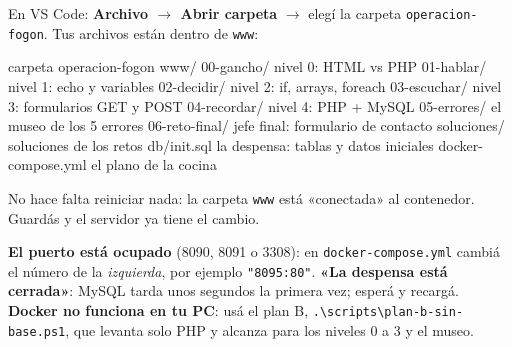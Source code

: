En VS Code: \textbf{Archivo $\rightarrow$ Abrir carpeta} $\rightarrow$ elegí la carpeta \texttt{operacion-fogon}. Tus archivos
están dentro de \texttt{www}:
\begin{terminal}[estructura]{carpeta operacion-fogon}
www/
  00-gancho/       nivel 0: HTML vs PHP
  01-hablar/       nivel 1: echo y variables
  02-decidir/      nivel 2: if, arrays, foreach
  03-escuchar/     nivel 3: formularios GET y POST
  04-recordar/     nivel 4: PHP + MySQL
  05-errores/      el museo de los 5 errores
  06-reto-final/   jefe final: formulario de contacto
  soluciones/      soluciones de los retos
db/init.sql        la despensa: tablas y datos iniciales
docker-compose.yml el plano de la cocina
\end{terminal}

\begin{center}
\end{center}
No hace falta reiniciar nada: la carpeta \texttt{www} está «conectada» al contenedor. Guardás y el servidor ya tiene el cambio.

\begin{ojo}
\textbf{El puerto está ocupado} (8090, 8091 o 3308): en \texttt{docker-compose.yml} cambiá el número de la \emph{izquierda}, por ejemplo \texttt{"8095:80"}.
\textbf{«La despensa está cerrada»}: MySQL tarda unos segundos la primera vez; esperá y recargá.
\textbf{Docker no funciona en tu PC}: usá el plan B, \texttt{.\textbackslash scripts\textbackslash plan-b-sin-base.ps1}, que levanta solo PHP y alcanza para los niveles 0 a 3 y el museo.
\end{ojo}
